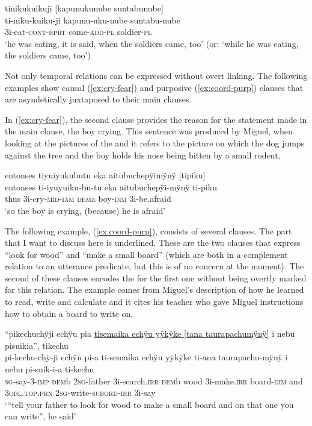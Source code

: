 \ea\label{ex:CONT-OV}
\begingl
\glpreamble tinikukuikuji \textup{[}kapunukunube suntabunube\textup{]}\\
\gla ti-niku-kuiku-ji kapunu-uku-nube suntabu-nube\\
\glb 3i-eat-\textsc{cont}-\textsc{rprt} come-\textsc{add}-\textsc{pl} soldier-\textsc{pl}\\
\glft ‘he was eating, it is said, when the soldiers came, too’ (or: ‘while he was eating, the soldiers came, too’)
\endgl
\trailingcitation{[jxx-p120430l-2.151]}
\xe

Not only temporal relations can be expressed without overt linking. The following examples show causal (\ref{ex:cry-fear}) and purposive (\ref{ex:coord-purp}) clauses that are asyndetically juxtaposed to their main clauses.

In (\ref{ex:cry-fear}), the second clause provides the reason for the statement made in the main clause, the boy crying. This sentence was produced by Miguel, when looking at the pictures of the  and it refers to the picture on which the dog jumps against the tree and the boy holds his nose being bitten by a small rodent.

\ea\label{ex:cry-fear}
\begingl
\glpreamble entonses tiyuiyukubutu eka aitubuchepÿimÿnÿ \textup{[}tipiku\textup{]}\\
\gla entonses ti-iyuyuiku-bu-tu eka aitubuchepÿi-mÿnÿ ti-piku\\
\glb thus 3i-cry-\textsc{mid}-\textsc{iam} \textsc{dem}a boy-\textsc{dim} 3i-be.afraid\\
\glft ‘so the boy is crying, (because) he is afraid’
\endgl
\trailingcitation{[mox-a110920l-2.083]}
\xe


The following example, (\ref{ex:coord-purp}), consists of several clauses. The part that I want to discuss here is underlined. These are the two clauses that express “look for wood” and “make a small board” (which are both in a complement relation to an utterance predicate, but this is of no concern at the moment). The second of these clauses encodes the  for the first one without being overtly marked for this relation. The example comes from Miguel’s description of how he learned to read, write and calculate and it cites his teacher who gave Miguel instructions how to obtain a board to write on.

\ea\label{ex:coord-purp}
\begingl
\glpreamble “pikechuchÿji echÿu pia \underline{tisemaika echÿu yÿkÿke \textup{[}tana taurapachumÿnÿ\textup{]}} i nebu pisuikia”, tikechu\\
\gla pi-kechu-chÿ-ji echÿu pi-a ti-semaika echÿu yÿkÿke ti-ana taurapachu-mÿnÿ i nebu pi-suik-i-a ti-kechu\\
\textsc{sg}-say-3-\textsc{imp} \textsc{dem}b 2\textsc{sg}-father 3i-search.\textsc{irr} \textsc{dem}b wood 3i-make.\textsc{irr} board-\textsc{dim} and 3\textsc{obl.top.prn} 2\textsc{sg}-write-\textsc{subord}-\textsc{irr} 3i-say\\
\glft ‘“tell your father to look for wood to make a small board and on that one you can write”, he said’
\endgl
\trailingcitation{[mxx-p181027l-1.022]}
\xe

